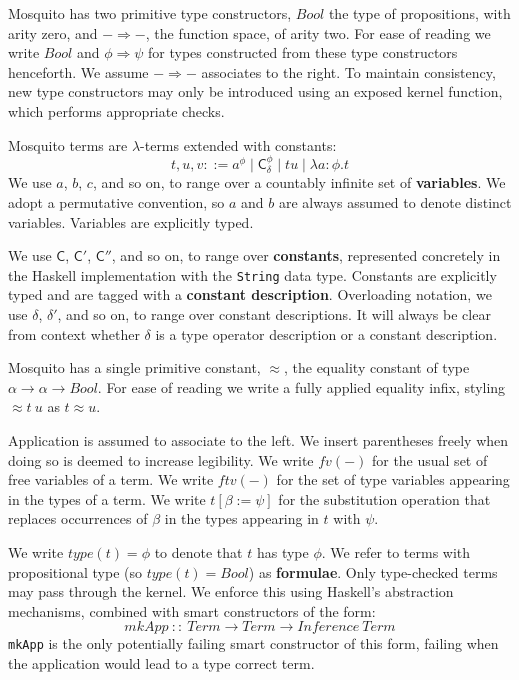 \documentclass{llncs}
\newcommand{\deffont}[1]{\textbf{#1}}
\newcommand{\lam}[1]{\lambda{#1}.}
\newcommand{\tf}[1]{\mathsf{#1}}
\begin{document}
Mosquito has two primitive type constructors, $Bool$ the type of propositions, with arity zero, and $- \Rightarrow -$, the function space, of arity two.
For ease of reading we write $Bool$ and $\phi \Rightarrow \psi$ for types constructed from these type constructors henceforth.
We assume $- \Rightarrow -$ associates to the right.
To maintain consistency, new type constructors may only be introduced using an exposed kernel function, which performs appropriate checks.

Mosquito terms are $\lambda$-terms extended with constants:
\begin{displaymath}
t, u, v ::= a^\phi \mid \tf{C}_\delta^\phi \mid tu \mid \lam{a{:}\phi}t
\end{displaymath}
We use $a$, $b$, $c$, and so on, to range over a countably infinite set of \deffont{variables}.
We adopt a permutative convention, so $a$ and $b$ are always assumed to denote distinct variables.
Variables are explicitly typed.

We use $\tf{C}$, $\tf{C}'$, $\tf{C}''$, and so on, to range over \deffont{constants}, represented concretely in the Haskell implementation with the \texttt{String} data type.
Constants are explicitly typed and are tagged with a \deffont{constant description}.
Overloading notation, we use $\delta$, $\delta'$, and so on, to range over constant descriptions.
It will always be clear from context whether $\delta$ is a type operator description or a constant description.

Mosquito has a single primitive constant, $\approx$, the equality constant of type $\alpha \rightarrow \alpha \rightarrow Bool$.
For ease of reading we write a fully applied equality infix, styling $\approx t\ u$ as $t \approx u$.

Application is assumed to associate to the left.
We insert parentheses freely when doing so is deemed to increase legibility.
We write $fv(-)$ for the usual set of free variables of a term.
We write $ftv(-)$ for the set of type variables appearing in the types of a term.
We write $t[\beta := \psi]$ for the substitution operation that replaces occurrences of $\beta$ in the types appearing in $t$ with $\psi$.

We write $type(t) = \phi$ to denote that $t$ has type $\phi$.
We refer to terms with propositional type (so $type(t) = Bool$) as \deffont{formulae}.
Only type-checked terms may pass through the kernel.
We enforce this using Haskell's abstraction mechanisms, combined with smart constructors of the form:
\begin{displaymath}
mkApp\ ::\ Term \rightarrow Term \rightarrow Inference\ Term
\end{displaymath}
\texttt{mkApp} is the only potentially failing smart constructor of this form, failing when the application would lead to a type correct term.
\end{document}
